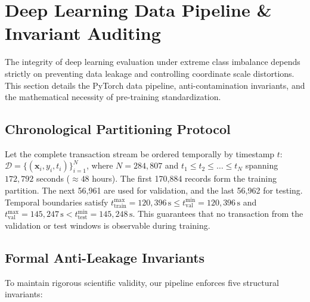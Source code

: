 
\section{Deep Learning Data Pipeline \& Invariant Auditing}
\label{sec:p2_dl_data_pipeline}

The integrity of deep learning evaluation under extreme class imbalance depends strictly on preventing data leakage and controlling coordinate scale distortions. This section details the PyTorch data pipeline, anti-contamination invariants, and the mathematical necessity of pre-training standardization.

\subsection{Chronological Partitioning Protocol}
Let the complete transaction stream be ordered temporally by timestamp $t$: $\mathcal{D} = \{(\mathbf{x}_i, y_i, t_i)\}_{i=1}^N$, where $N = 284,807$ and $t_1 \le t_2 \le \dots \le t_N$ spanning $172,792$ seconds ($\approx 48$ hours). The first 170,884 records form the training partition. The next 56,961 are used for validation, and the last 56,962 for testing.
Temporal boundaries satisfy $t_{\text{train}}^{\max} = 120,396\,\text{s} \le t_{\text{val}}^{\min} = 120,396\,\text{s}$ and $t_{\text{val}}^{\max} = 145,247\,\text{s} < t_{\text{test}}^{\min} = 145,248\,\text{s}$. This guarantees that no transaction from the validation or test windows is observable during training.

\subsection{Formal Anti-Leakage Invariants}
To maintain rigorous scientific validity, our pipeline enforces five structural invariants:

